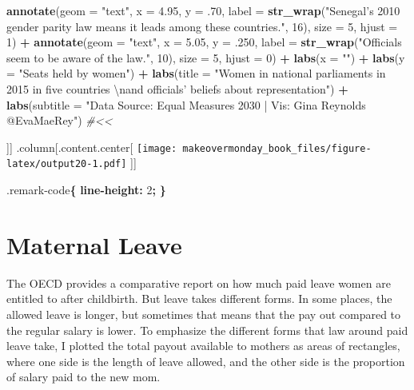 \documentclass[]{book}
\newenvironment{Shaded}{\begin{snugshade}}{\end{snugshade}}
\newcommand{\KeywordTok}[1]{\textcolor[rgb]{0.13,0.29,0.53}{\textbf{#1}}}
\newcommand{\DataTypeTok}[1]{\textcolor[rgb]{0.13,0.29,0.53}{#1}}
\newcommand{\DecValTok}[1]{\textcolor[rgb]{0.00,0.00,0.81}{#1}}
\newcommand{\FloatTok}[1]{\textcolor[rgb]{0.00,0.00,0.81}{#1}}
\newcommand{\CharTok}[1]{\textcolor[rgb]{0.31,0.60,0.02}{#1}}
\newcommand{\StringTok}[1]{\textcolor[rgb]{0.31,0.60,0.02}{#1}}
\newcommand{\CommentTok}[1]{\textcolor[rgb]{0.56,0.35,0.01}{\textit{#1}}}
\newcommand{\OperatorTok}[1]{\textcolor[rgb]{0.81,0.36,0.00}{\textbf{#1}}}
\newcommand{\NormalTok}[1]{#1}
\theoremstyle{definition}
\theoremstyle{definition}
\theoremstyle{definition}
\theoremstyle{remark}
\begin{document}
\begin{Shaded}
\begin{Highlighting}[]
\StringTok{  }\KeywordTok{annotate}\NormalTok{(}\DataTypeTok{geom =} \StringTok{"text"}\NormalTok{, }\DataTypeTok{x =} \FloatTok{4.95}\NormalTok{, }\DataTypeTok{y =}\NormalTok{ .}\DecValTok{70}\NormalTok{, }\DataTypeTok{label =} \KeywordTok{str_wrap}\NormalTok{(}\StringTok{"Senegal's 2010 gender parity law means it leads among these countries."}\NormalTok{, }\DecValTok{16}\NormalTok{), }\DataTypeTok{size =} \DecValTok{5}\NormalTok{, }\DataTypeTok{hjust =} \DecValTok{1}\NormalTok{) }\OperatorTok{+}
\StringTok{  }\KeywordTok{annotate}\NormalTok{(}\DataTypeTok{geom =} \StringTok{"text"}\NormalTok{, }\DataTypeTok{x =} \FloatTok{5.05}\NormalTok{, }\DataTypeTok{y =}\NormalTok{ .}\DecValTok{250}\NormalTok{, }\DataTypeTok{label =} \KeywordTok{str_wrap}\NormalTok{(}\StringTok{"Officials seem to be aware of the law."}\NormalTok{, }\DecValTok{10}\NormalTok{), }\DataTypeTok{size =} \DecValTok{5}\NormalTok{, }\DataTypeTok{hjust =} \DecValTok{0}\NormalTok{) }\OperatorTok{+}
\StringTok{  }\KeywordTok{labs}\NormalTok{(}\DataTypeTok{x =} \StringTok{""}\NormalTok{) }\OperatorTok{+}
\StringTok{  }\KeywordTok{labs}\NormalTok{(}\DataTypeTok{y =} \StringTok{"Seats held by women"}\NormalTok{) }\OperatorTok{+}
\StringTok{  }\KeywordTok{labs}\NormalTok{(}\DataTypeTok{title =} \StringTok{"Women in national parliaments in 2015 in five countries }\CharTok{\textbackslash{}n}\StringTok{and officials' beliefs about representation"}\NormalTok{) }\OperatorTok{+}
\StringTok{  }\KeywordTok{labs}\NormalTok{(}\DataTypeTok{subtitle =} \StringTok{"Data Source: Equal Measures 2030 | Vis: Gina Reynolds @EvaMaeRey"}\NormalTok{) }\CommentTok{#<<}
\end{Highlighting}
\end{Shaded}

{]}{]} .column{[}.content.center{[}
\texttt{[image: makeovermonday\_book\_files/figure-latex/output20-1.pdf]}
{]}{]}

\begin{Shaded}
\begin{Highlighting}[]
\FloatTok{.remark-code}\KeywordTok{\{} \KeywordTok{line-height:} \DataTypeTok{2}\KeywordTok{;} \KeywordTok{\}}
\end{Highlighting}
\end{Shaded}

\chapter{Maternal Leave}\label{maternal-leave}

The OECD provides a comparative report on how much paid leave women are
entitled to after childbirth. But leave takes different forms. In some
places, the allowed leave is longer, but sometimes that means that the
pay out compared to the regular salary is lower. To emphasize the
different forms that law around paid leave take, I plotted the total
payout available to mothers as areas of rectangles, where one side is
the length of leave allowed, and the other side is the proportion of
salary paid to the new mom.
\end{document}

